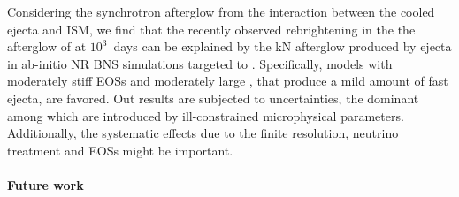 Considering the synchrotron afterglow from the interaction between the cooled ejecta and 
\ac{ISM}, we find that the recently observed rebrightening in the the afterglow of \GRB{} 
at $10^3$~days can be explained by the \ac{kN} afterglow produced by ejecta in 
ab-initio \ac{NR} \ac{BNS} simulations targeted to \GW{}. 
%
Specifically, models with moderately stiff \acp{EOS} and moderately large \mr{}, 
that produce a mild amount of fast ejecta, are favored.
%
Out results are subjected to uncertainties, the dominant among which are introduced 
by ill-constrained microphysical parameters. 
Additionally, the systematic effects due to the finite resolution, neutrino treatment 
and \acp{EOS} might be important. 


\paragraph{Future work}

